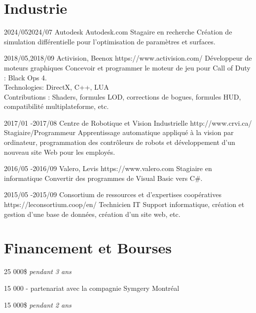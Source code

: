 \documentclass[10pt]{article} %
\begin{document}
\section{Industrie}

\job
{2024/05}{2024/07}
{Autodesk}
{Autodesk.com}
{Stagaire en recherche}
{Création de simulation différentielle pour l'optimisation de paramètres et surfaces.}


\job
{2018/05,}{2018/09}
{Activision, Beenox}
{https://www.activision.com/}
{Développeur de moteurs graphiques}
{Concevoir et programmer le moteur de jeu pour Call of Duty : Black Ops 4.\\
 Technologies: DirectX, C++, LUA \\
 Contributions : Shaders, formules LOD, corrections de bogues, formules HUD, compatibilité multiplateforme, etc.}


\job
{2017/01 -}{2017/08}
{Centre de Robotique et Vision Industrielle}
{http://www.crvi.ca/}
{Stagiaire/Programmeur}
{Apprentissage automatique appliqué à la vision par ordinateur, programmation des contrôleurs de robots et développement d'un nouveau
site Web pour les employés.}

\job
{2016/05 -}{2016/09}
{Valero, Levis}
{https://www.valero.com}
{Stagiaire en informatique}
{Convertir des programmes de Visual Basic vers C\#.}

\job
{2015/05 -}{2015/09}
{Consortium de ressources et d'expertises coopératives}
{https://leconsortium.coop/en/}
{Technicien IT}
{Support informatique, création et gestion d'une base de données, création d'un site web, etc.}


\section{Financement et Bourses}

{
 25 000\$  \textit{pendant 3 ans}\\
}

{
 15 000 - partenariat avec la compagnie Symgery Montréal\\
}

{
 15 000\$ \textit{pendant 2 ans} \\
}
\end{document}

